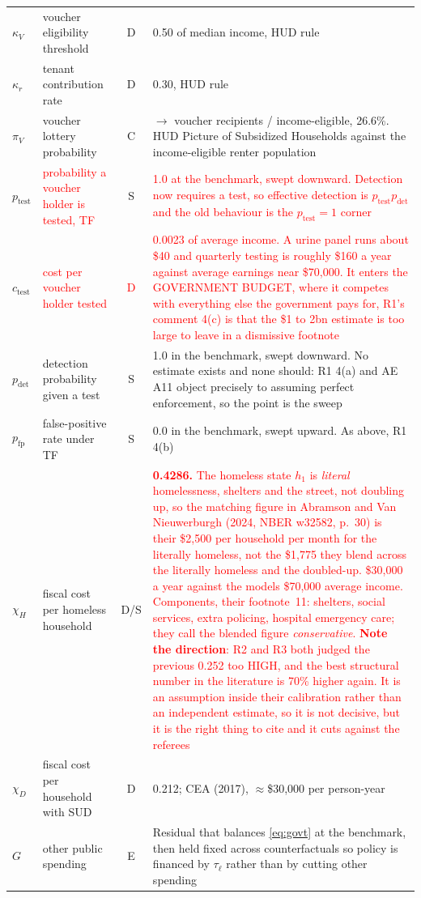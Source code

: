 \documentclass[11pt]{article}
\newcommand{\nw}[1]{\textcolor{red}{#1}}
\begin{document}
\begin{longtable}{lL{3.8cm}cL{5.8cm}}
$\kappa_V$ & voucher eligibility threshold & D & 0.50 of median income, HUD rule\\
$\kappa_r$ & tenant contribution rate & D & 0.30, HUD rule\\
$\pi_V$ & voucher lottery probability & C & $\rightarrow$ voucher recipients / income-eligible, 26.6\%. HUD Picture of Subsidized Households against the income-eligible renter population\\
$p_{\text{test}}$ & \nw{probability a voucher holder is tested, TF} & S & \nw{1.0 at the benchmark, swept downward. Detection now requires a test, so effective detection is $p_{\text{test}}p_{\text{det}}$ and the old behaviour is the $p_{\text{test}}=1$ corner}\\
$c_{\text{test}}$ & \nw{cost per voucher holder tested} & \nw{D} & \nw{0.0023 of average income. A urine panel runs about \$40 and quarterly testing is roughly \$160 a year against average earnings near \$70,000. It enters the GOVERNMENT BUDGET, where it competes with everything else the government pays for, R1's comment 4(c) is that the \$1 to 2bn estimate is too large to leave in a dismissive footnote}\\
$p_{\text{det}}$ & detection probability given a test & S & 1.0 in the benchmark, swept downward. No estimate exists and none should: R1 4(a) and AE A11 object precisely to assuming perfect enforcement, so the point is the sweep\\
$p_{\text{fp}}$ & false-positive rate under TF & S & 0.0 in the benchmark, swept upward. As above, R1 4(b)\\
$\chi_H$ & fiscal cost per homeless household & D/S & \nw{\textbf{0.4286.} The homeless state $h_1$ is \emph{literal} homelessness, shelters and the street, not doubling up, so the matching figure in Abramson and Van Nieuwerburgh (2024, NBER w32582, p.~30) is their \$2{,}500 per household per month for the literally homeless, not the \$1{,}775 they blend across the literally homeless and the doubled-up. \$30{,}000 a year against the models \$70{,}000 average income. Components, their footnote~11: shelters, social services, extra policing, hospital emergency care; they call the blended figure \emph{conservative}. \textbf{Note the direction}: R2 and R3 both judged the previous 0.252 too HIGH, and the best structural number in the literature is 70\% higher again. It is an assumption inside their calibration rather than an independent estimate, so it is not decisive, but it is the right thing to cite and it cuts against the referees}\\
$\chi_D$ & fiscal cost per household with SUD & D & 0.212; CEA (2017), $\approx$\$30,000 per person-year\\
$G$ & other public spending & E & Residual that balances \eqref{eq:govt} at the benchmark, then held fixed across counterfactuals so policy is financed by $\tau_{\ell}$ rather than by cutting other spending\\
\bottomrule
\end{longtable}
\end{document}
